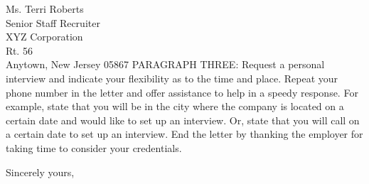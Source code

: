 \begin{letter}{Ms. Terri Roberts \\
Senior Staff Recruiter \\
XYZ Corporation \\
Rt. 56 \\
Anytown, New Jersey 05867}
\noindent PARAGRAPH THREE: Request a personal interview and  indicate  your 
flexibility as to the time and place. Repeat your phone number in 
the letter and offer assistance to help in a speedy response. For 
example,  state that you will be in the city where the company is 
located on a certain date and would like to set up an  interview. 
Or,  state  that  you  will  call  on a certain date to set up an 
interview. End the letter by thanking  the  employer  for  taking 
time to consider your credentials. 
 
\closing{Sincerely yours,} 
 

 
\encl{}					%

\end{letter}
 


